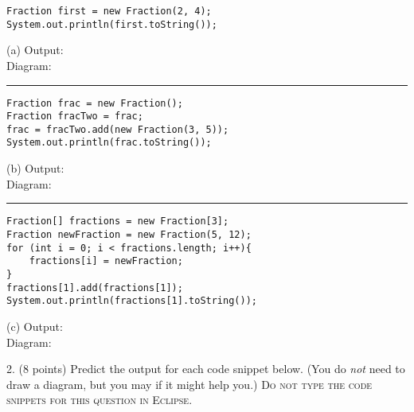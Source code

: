 \documentclass[12pt,twoside]{article}
\newcommand{\fillInBlank}[1][0.5in]{\underline{\hspace{#1}}}
\begin{document}
\begin{minipage}[t]{0.55\linewidth}
\begin{lstlisting}
Fraction first = new Fraction(2, 4);
System.out.println(first.toString());
\end{lstlisting}
\end{minipage}
\hspace{0.25in}
\begin{minipage}[t]{0.3\linewidth}
\vspace{0.1in}
(a) Output: \fillInBlank[1in]\\
Diagram:
\end{minipage}

\vfill
\hrule
\begin{minipage}[t]{0.55\linewidth}
\begin{lstlisting}
Fraction frac = new Fraction();
Fraction fracTwo = frac;
frac = fracTwo.add(new Fraction(3, 5));
System.out.println(frac.toString());
\end{lstlisting}
\end{minipage}
\hspace{0.25in}
\begin{minipage}[t]{0.3\linewidth}
\vspace{0.1in}
(b) Output: \fillInBlank[1in]\\
Diagram:
\end{minipage}

\vfill
\hrule
\begin{minipage}[t]{0.58\linewidth}
\begin{lstlisting}
Fraction[] fractions = new Fraction[3];
Fraction newFraction = new Fraction(5, 12);
for (int i = 0; i < fractions.length; i++){
	fractions[i] = newFraction;
}
fractions[1].add(fractions[1]);
System.out.println(fractions[1].toString());
\end{lstlisting}
\end{minipage}
\hspace{0.25in}
\begin{minipage}[t]{0.3\linewidth}
\vspace{0.1in}
(c) Output: \fillInBlank[1in]\\
Diagram:
\end{minipage}
\vfill


\clearpage

2. (8 points) Predict the output for each code snippet below. (You do \emph{not} need to draw a diagram, but you may if it might help you.) \textsc{Do not type the code snippets for this question in Eclipse}.
\vspace{0.25in}
\end{document}

